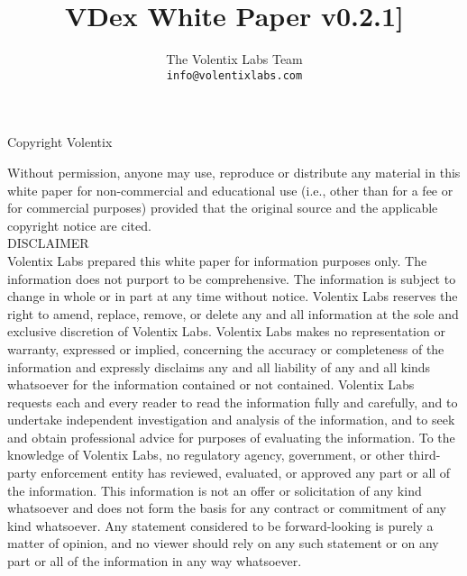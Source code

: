 \documentclass[]{article}
\title{VDex White Paper v0.2.1]}
\author{
		The Volentix Labs Team\\
	\texttt{info@volentixlabs.com}
}
\begin{document}
\tableofcontents
\maketitle
\begin{description}
\item Copyright  Volentix
\end{description}

{\tiny Without permission, anyone may use, reproduce or distribute any material in this white paper for non-commercial and educational use (i.e., other than for a fee or for commercial purposes) provided that the original source and the applicable copyright notice are cited.\\

DISCLAIMER \\

Volentix Labs prepared this white paper for information purposes only. The information does not purport to be comprehensive. The information is subject to change in whole or in part at any time without notice. Volentix Labs reserves the right to amend, replace, remove, or delete any and all information at the sole and exclusive discretion of Volentix Labs. Volentix Labs makes no representation or warranty, expressed or implied, concerning the accuracy or completeness of the information and expressly disclaims any and all liability of any and all kinds whatsoever for the information contained or not contained. Volentix Labs requests each and every reader to read the information fully and carefully, and to undertake independent investigation and analysis of the information, and to seek and obtain professional advice for purposes of evaluating the information. To the knowledge of Volentix Labs, no regulatory agency, government, or other third-party enforcement entity has reviewed, evaluated, or approved any part or all of the information. This information is not an offer or solicitation of any kind whatsoever and does not form the basis for any contract or commitment of any kind whatsoever. Any statement considered to be forward-looking is purely a matter of opinion, and no viewer should rely on any such statement or on any part or all of the information in any way whatsoever.

}
\end{document}
